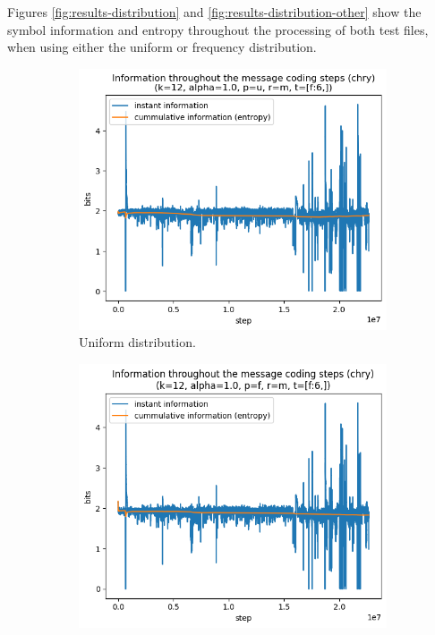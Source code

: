 \documentclass{article}
\begin{document}
Figures \ref{fig:results-distribution} and \ref{fig:results-distribution-other} show the symbol information and entropy throughout the processing of both test files, when using either the uniform or frequency distribution.

\begin{figure}
    \begin{subfigure}[b]{0.45\textwidth}
        \begin{center}
            \includegraphics[width=1.0\linewidth]{../scripts/images/chry_12_1.0_u_m_[f:6,].png}
        \end{center}
        \caption{Uniform distribution.}
        \label{fig:results-distribution-uniform}
    \end{subfigure}
    \hfill
    \begin{subfigure}[b]{0.45\textwidth}
        \begin{center}
            \includegraphics[width=1.0\linewidth]{../scripts/images/chry_12_1.0_f_m_[f:6,].png}

\end{center}
\end{subfigure}
\end{figure}
\end{document}
